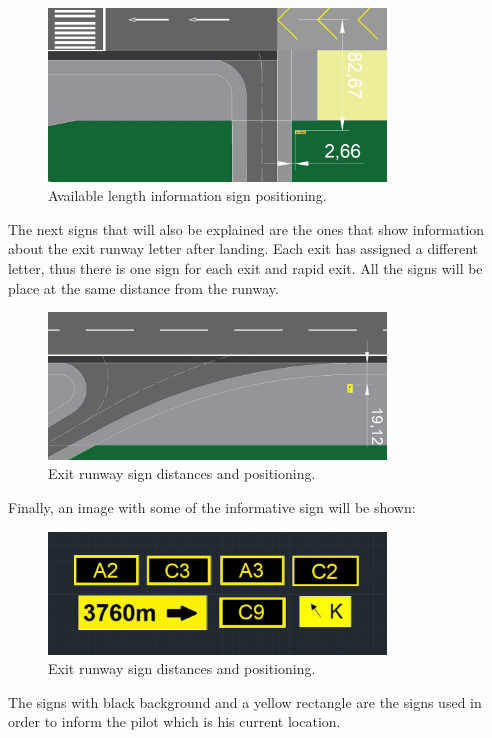 	\begin{figure}[H]
		\centering
		\includegraphics[clip, trim=0cm 0cm 0cm 0cm, width=0.8\textwidth]{./images/signsexamples/TODAsign}
		\caption{Available length information sign positioning.} %
		\label{} %
	\end{figure}

	The next signs that will also be explained are the ones that show information about the exit runway letter after landing. Each exit has assigned a different letter, thus there is one sign for each exit and rapid exit. All the signs will be place at the same distance from the runway. 
	
	\begin{figure}[H]
		\centering
		\includegraphics[clip, trim=0cm 0cm 0cm 0cm, width=0.8\textwidth]{./images/signsexamples/exitexample}
		\caption{Exit runway sign distances and positioning.} %
		\label{} %
	\end{figure}

	Finally, an image with some of the informative sign will be shown:
	
	\begin{figure}[H]
		\centering
		\includegraphics[clip, trim=0cm 0cm 0cm 0cm, width=0.8\textwidth]{./images/signsexamples/exempleinf}
		\caption{Exit runway sign distances and positioning.} %
		\label{} %
	\end{figure}
	
	The signs with black background and a yellow rectangle are the signs used in order to inform the pilot which is his current location. 
	

	